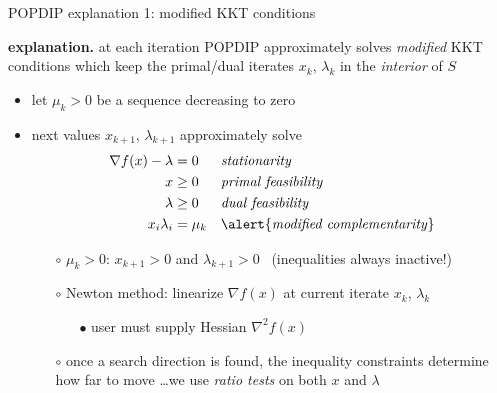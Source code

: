 \documentclass[10pt,hyperref,dvipsnames]{beamer}
\newcommand{\grad}{\nabla}
\begin{document}
\begin{frame}{POPDIP explanation 1: modified KKT conditions}

\textbf{explanation.}  at each iteration POPDIP approximately solves \emph{modified} KKT conditions which keep the primal/dual iterates $x_k$, $\lambda_k$ in the \emph{interior} of $S$

\bigskip
\begin{itemize}
\item let $\mu_k>0$ be a sequence decreasing to zero
\item next values $x_{k+1}$, $\lambda_{k+1}$ approximately solve
\begin{align*}
\grad f(x) - \lambda &= 0   &&\text{\emph{stationarity}} \\
                   x &\ge 0 &&\text{\emph{primal feasibility}} \\
             \lambda &\ge 0 &&\text{\emph{dual feasibility}} \\
       x_i \lambda_i &= \mu_k && \text{\alert{\emph{modified complementarity}}}
\end{align*}

    \begin{itemize}
    \item[$\circ$] $\mu_k>0$: \quad $x_{k+1} > 0$ and $\lambda_{k+1} > 0$ \, (inequalities always inactive!)
    \item[$\circ$] Newton method: linearize $\grad f(x)$ at current iterate $x_k$, $\lambda_k$ {\large\strut}
        \begin{itemize}
        \item[$\bullet$] user must supply Hessian $\grad^2 f(x)$
        \end{itemize}
    \item[$\circ$] once a search direction is found, the inequality constraints determine how far to move \dots \quad we use \emph{ratio tests} on both $x$ and $\lambda$
    \end{itemize}
\end{itemize}
\end{frame}
\end{document}
